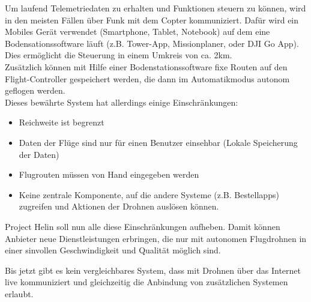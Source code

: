 Um laufend Telemetriedaten zu erhalten und Funktionen steuern zu können, wird in den meisten Fällen über Funk mit dem Copter kommuniziert. Dafür wird ein Mobiles Gerät verwendet (Smartphone, Tablet, Notebook) auf dem eine Bodensationssoftware läuft (z.B. Tower-App, Missionplaner, oder DJI Go App). Dies ermöglicht die Steuerung in einem Umkreis von ca. 2km.  \\

Zusätzlich können mit Hilfe einer Bodenstationssoftware fixe Routen auf den Flight-Controller gespeichert werden, die dann im Automatikmodus autonom geflogen werden.\\

Dieses bewährte System hat allerdings einige Einschränkungen: 

\begin{itemize}
	\item{Reichweite ist begrenzt}
	\item{Daten der Flüge sind nur für einen Benutzer einsehbar (Lokale Speicherung der Daten)}
	\item{Flugrouten müssen von Hand eingegeben werden}
	\item{Keine zentrale Komponente, auf die andere Systeme (z.B. Bestellapps) zugreifen und Aktionen der Drohnen auslösen können.}
\end{itemize}

Project Helin soll nun alle diese Einschränkungen aufheben. Damit können Anbieter neue Dienstleistungen erbringen, die nur mit autonomen Flugdrohnen in einer sinvollen Geschwindigkeit und Qualität möglich sind.

Bis jetzt gibt es kein vergleichbares System, dass mit Drohnen über das Internet live kommuniziert und gleichzeitig die Anbindung von zusätzlichen Systemen erlaubt.

